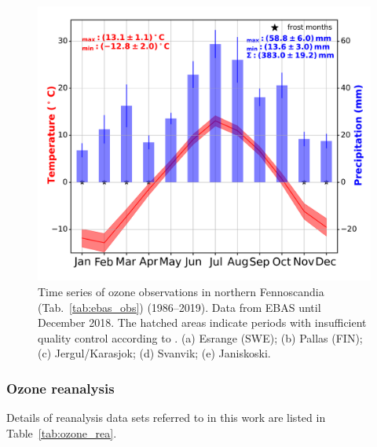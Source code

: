 \documentclass[bg, manuscript]{copernicus}
\begin{document}
\begin{figure}[t]
  \includegraphics[width=12cm]{fig04}
  \caption{Time series of ozone observations in northern Fennoscandia (Tab.~\ref{tab:ebas_obs}) (1986--2019). Data from EBAS until December 2018. The hatched areas indicate periods with insufficient quality control according to \citet{NILU2003}. (a) Esrange (SWE); (b) Pallas (FIN); (c) Jergul/Karasjok; (d) Svanvik; (e) Janiskoski.}
  \label{fig:ozone_timesseries_fenoscandic_obs}
\end{figure}

\subsubsection{Ozone reanalysis}
\label{subsubsec:ozone_rea}

Details of reanalysis data sets referred to in this work are listed in Table~\ref{tab:ozone_rea}.
\end{document}
